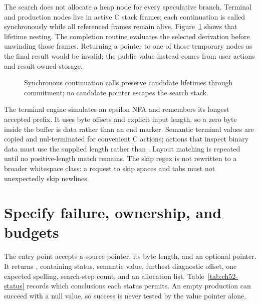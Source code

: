 The search does not allocate a heap node for every speculative branch.
Terminal and production nodes live in active C stack frames; each continuation is called synchronously while all referenced frames remain alive.
Figure~\ref{fig:ch52-lifetime} shows that lifetime nesting.
The completion routine evaluates the selected derivation before unwinding those frames.
Returning a pointer to one of those temporary nodes as the final result would be invalid; the public value instead comes from user actions and result-owned storage.

\begin{figure}[htbp]
\centering
{}
\caption{Synchronous continuation calls preserve candidate lifetimes through commitment; no candidate pointer escapes the search stack.}
\label{fig:ch52-lifetime}
\end{figure}

The terminal engine simulates an epsilon NFA and remembers its longest accepted prefix.
It uses byte offsets and explicit input length, so a zero byte inside the buffer is data rather than an end marker.
Semantic terminal values are copied and nul-terminated for convenient C actions; actions that inspect binary data must use the supplied length rather than .
Layout matching is repeated until no positive-length match remains.
The skip regex is not rewritten to a broader whitespace class: a request to skip spaces and tabs must not unexpectedly skip newlines.

\section{Specify failure, ownership, and budgets}
\label{sec:ch52-api}

The entry point accepts a source pointer, its byte length, and an optional  pointer.
It returns , containing status, semantic value, furthest diagnostic offset, one expected spelling, search-step count, and an allocation list.
Table~\ref{tab:ch52-status} records which conclusions each status permits.
An empty production can succeed with a null value, so success is never tested by the value pointer alone.


